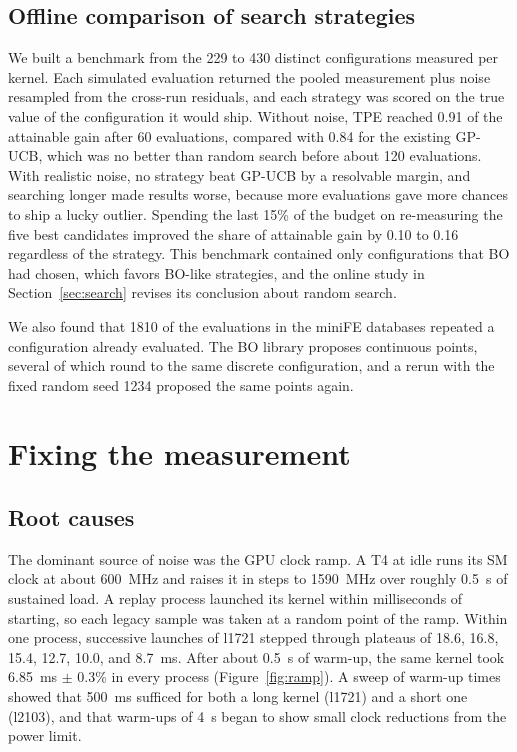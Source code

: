 \documentclass[10pt]{article}
\begin{document}
\subsection{Offline comparison of search strategies}
We built a benchmark from the 229 to 430 distinct configurations measured per
kernel. Each simulated evaluation returned the pooled measurement plus noise
resampled from the cross-run residuals, and each strategy was scored on the
true value of the configuration it would ship. Without noise, TPE reached
0.91 of the attainable gain after 60 evaluations, compared with 0.84 for the
existing GP-UCB, which was no better than random search before about 120
evaluations. With realistic noise, no strategy beat GP-UCB by a resolvable
margin, and searching longer made results worse, because more evaluations
gave more chances to ship a lucky outlier. Spending the last 15\% of the
budget on re-measuring the five best candidates improved the share of
attainable gain by 0.10 to 0.16 regardless of the strategy. This benchmark
contained only configurations that BO had chosen, which favors BO-like
strategies, and the online study in Section~\ref{sec:search} revises its
conclusion about random search.

We also found that 1810 of the evaluations in the miniFE databases repeated
a configuration already evaluated. The BO library proposes continuous points,
several of which round to the same discrete configuration, and a rerun with
the fixed random seed 1234 proposed the same points again.

\section{Fixing the measurement}
\label{sec:measurement}

\subsection{Root causes}
The dominant source of noise was the GPU clock ramp. A T4 at idle runs its SM
clock at about 600~MHz and raises it in steps to 1590~MHz over roughly
0.5~s of sustained load. A replay process launched its kernel within
milliseconds of starting, so each legacy sample was taken at a random point
of the ramp. Within one process, successive launches of l1721 stepped
through plateaus of 18.6, 16.8, 15.4, 12.7, 10.0, and 8.7~ms. After about
0.5~s of warm-up, the same kernel took 6.85~ms $\pm$ 0.3\% in every
process (Figure~\ref{fig:ramp}). A sweep of warm-up times showed that 500~ms sufficed for both a
long kernel (l1721) and a short one (l2103), and that warm-ups of 4~s began to
show small clock reductions from the power limit.
\end{document}
